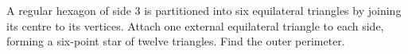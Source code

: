 A regular hexagon of side 3 is partitioned into six equilateral triangles by joining its centre to its vertices. Attach one external equilateral triangle to each side, forming a six-point star of twelve triangles. Find the outer perimeter.
